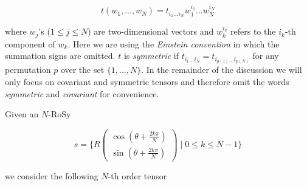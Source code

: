 \documentclass{acmsiggraph}               %
\begin{document}
\begin{equation}
t(w_1, ..., w_N)=t_{i_1 ... i_N}w_1^{i_1}  ...  w_N^{i_N}
\end{equation}

\noindent where $w_j$'s ($1\le j \le N$) are two-dimensional vectors
and $w_k^{i_k}$ refers to the $i_k$-th component of $w_k$. Here we
are using the {\em Einstein convention} in which the summation signs
are omitted. $t$ is {\em symmetric} if $t_{i_1 ... i_N}=t_{i_{p(1)}
... i_{p(N)}}$ for any permutation $p$ over the set $\{1, ..., N\}$.
In the remainder of the discussion we will only focus on covariant
and symmetric tensors and therefore omit the words {\em symmetric}
and {\em covariant} for convenience.

Given an $N$-RoSy

\begin{equation}
s = \{R\begin{pmatrix} \cos(\theta + \frac{2k\pi}{N}) \\ \sin(\theta
+ \frac{2k\pi}{N}) \end{pmatrix} \mid 0 \le k \le N-1 \}
\end{equation}

\noindent we consider the following $N$-th order tensor
%
%
\end{document}
